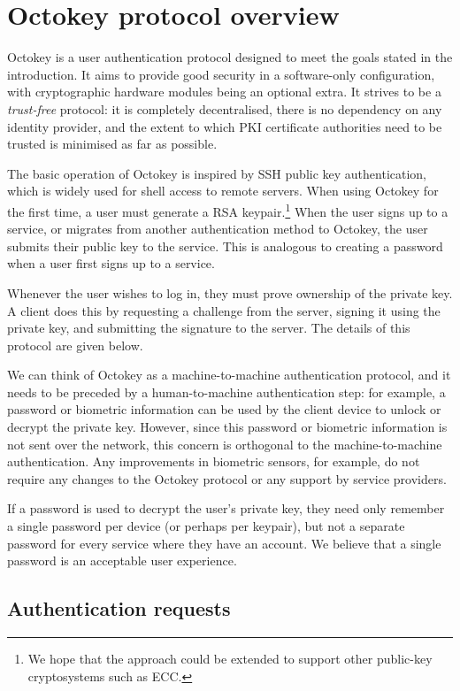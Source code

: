 \section{Octokey protocol overview}

Octokey is a user authentication protocol designed to meet the goals stated in the introduction. It
aims to provide good security in a software-only configuration, with cryptographic hardware modules
being an optional extra. It strives to be a \emph{trust-free} protocol: it is completely
decentralised, there is no dependency on any identity provider, and the extent to which PKI
certificate authorities need to be trusted is minimised as far as possible.

The basic operation of Octokey is inspired by SSH public key authentication, which is widely used
for shell access to remote servers. When using Octokey for the first time, a user must generate a
RSA keypair.\footnote{We hope that the approach could be extended to support other public-key
cryptosystems such as ECC.} When the user signs up to a service, or migrates from another
authentication method to Octokey, the user submits their public key to the service. This is
analogous to creating a password when a user first signs up to a service.

Whenever the user wishes to log in, they must prove ownership of the private key. A client does this
by requesting a challenge from the server, signing it using the private key, and submitting the
signature to the server. The details of this protocol are given below.

We can think of Octokey as a machine-to-machine authentication protocol, and it needs to be preceded
by a human-to-machine authentication step: for example, a password or biometric information can be
used by the client device to unlock or decrypt the private key. However, since this password or
biometric information is not sent over the network, this concern is orthogonal to the
machine-to-machine authentication. Any improvements in biometric sensors, for example, do not
require any changes to the Octokey protocol or any support by service providers.

If a password is used to decrypt the user's private key, they need only remember a single password
per device (or perhaps per keypair), but not a separate password for every service where they have
an account. We believe that a single password is an acceptable user experience.

\subsection{Authentication requests}

